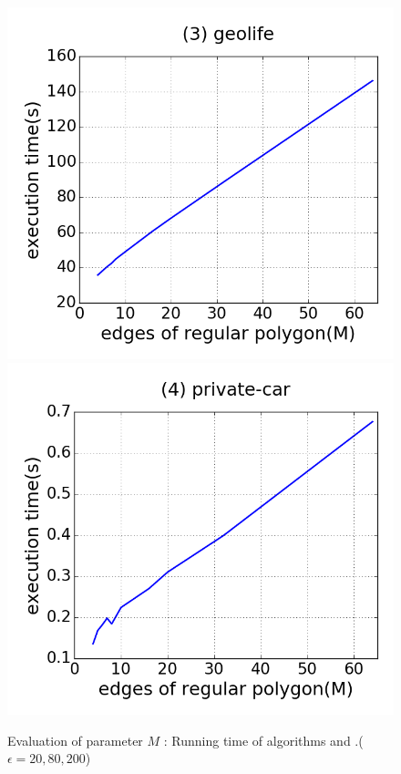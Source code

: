 \begin{figure}[tb!]
\includegraphics[scale = 0.25]{figures/Exp-M-time-geolife.png}
\includegraphics[scale = 0.25]{figures/Exp-M-time-private.png}
\vspace{-2ex}
\caption{\small Evaluation of parameter $M$ : Running time of algorithms \rpia and \cpia.($\epsilon = 20, 80, 200$)}
\label{fig:m-poly-time}
\vspace{-1ex}
\end{figure}

